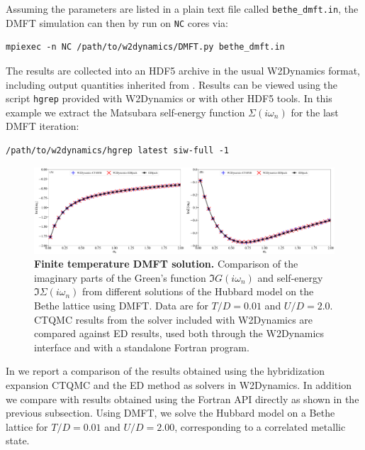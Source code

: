 \documentclass[edipack_sp.tex]{subfiles}
\begin{document}
Assuming the parameters are listed in a plain text file called 
{\tt bethe\_dmft.in}, the DMFT simulation can then by run on {\tt NC} cores via:
\begin{lstlisting}[style=mybash,numbers=none,morekeywords={mpiexec},deletekeywords={in}]
mpiexec -n NC /path/to/w2dynamics/DMFT.py bethe_dmft.in
\end{lstlisting}

The results are collected into an HDF5 \cite{The_HDF_Group_Hierarchical_Data_Format} archive in the usual W2Dynamics format, including output quantities inherited from \NAME. Results can be viewed using the script {\tt hgrep} provided with W2Dynamics or with other HDF5 tools. In this example we extract the Matsubara self-energy function $\Sigma(i\omega_n)$ for the last DMFT iteration:
\begin{lstlisting}[style=mybash,numbers=none]
/path/to/w2dynamics/hgrep latest siw-full -1
\end{lstlisting}

\begin{figure}%
  \includegraphics[width=\linewidth]{figures/figBetheW2D.pdf}
    \caption{\label{figEx1W}%
    \textbf{Finite temperature DMFT solution.}
    Comparison of the imaginary parts of the Green's function $\Im{G}(i\omega_n)$ and self-energy $\Im{\Sigma}(i\omega_n)$ from different solutions of the Hubbard model on the Bethe lattice using DMFT. Data are for $T/D=0.01$ and $U/D=2.0$. CTQMC results from the solver included with W2Dynamics are compared against \NAME ED results, used both through the W2Dynamics interface and with a standalone Fortran program. 
        }
\end{figure}

In  we report a comparison of the results obtained using the hybridization expansion CTQMC and the \NAME ED method as solvers in W2Dynamics. In addition we compare with results obtained using the Fortran API directly as shown in the previous subsection. Using DMFT, we solve the Hubbard model on a Bethe lattice for $T/D=0.01$ and $U/D=2.00$, corresponding to a correlated metallic state. 
\end{document}
